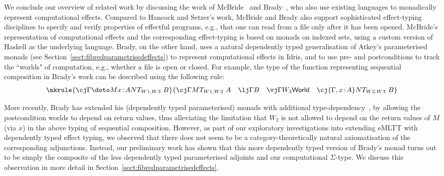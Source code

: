 We conclude our overview of related work by discussing the work of McBride~\cite{McBride:Kleisli} and Brady~\cite{Brady:Effects}, who also use existing languages to monadically represent computational effects. Compared to Hancock and Setzer's work, McBride and Brady also support sophisticated effect-typing disciplines to specify and verify properties of effectful programs, e.g., that one can read from a file only after it has been opened. McBride's representation of computational effects and the corresponding effect-typing is based on monads on indexed sets, using a custom version of Haskell as the underlying language. 
%
Brady, on the other hand, uses a natural dependently typed generalisation of Atkey's parameterised monads (see Section~\ref{sect:fibredparametrisedeffects}) to represent computational effects in Idris, and to use pre- and postconditions to track the ``worlds" of computation, e.g., whether a file is open or closed. For example, the type of the function representing sequential composition in Brady's work can be described using the following rule:
\vspace{0.15cm}
\[
\mkrule
{\cj \Gamma {\doto M {x \!:\! A} {} N} {T_{W1,W3}~B}}
{
\cj \Gamma M T_{W1,W2}~A
\quad
\lj \Gamma B
\quad
\vj \Gamma {W_3} {\mathsf{World}}
\quad
\cj {\Gamma, x \!:\! A} N T_{W2,W3}~B
}
\vspace{-0.1cm}
\]

More recently, Brady has extended his (dependently typed parameterised) monads with additional type-dependency~\cite{Brady:ResourceDependentEffects}, by allowing the postcondition worlds to depend on return values, thus alleviating the limitation that $W_2$ is not allowed to depend on the return values of $M$ (via $x$) in the above typing of sequential composition. 
%
However, as part of our exploratory investigations into extending eMLTT with dependently typed effect typing, we observed that there does not seem to be a category-theoretically natural axiomatisation of the corresponding adjunctions. Instead, our preliminary work has shown that this more dependently typed version of Brady's monad turns out to be simply the composite of the less dependently typed parameterised adjoints and our computational $\Sigma$-type. We discuss this observation in more detail in Section~\ref{sect:fibredparametrisedeffects}.











